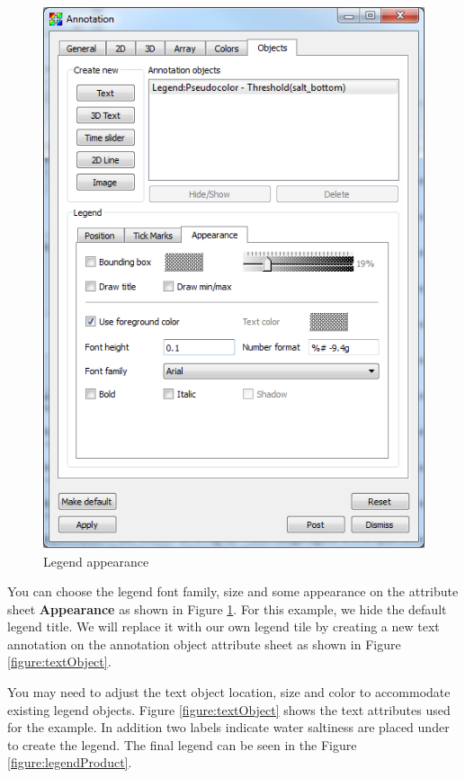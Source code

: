 \documentclass[12pt]{report}
\begin{document}
				\begin{figure}
        \begin{center}
        \includegraphics{legendAttrAppear}
        \caption{Legend appearance}
        \label{figure:legendAttrAppear}
        \end{center}
        \end{figure} 
				  
You can choose the legend font family, size and some appearance on the attribute sheet {\bf Appearance} as shown in
Figure \ref{figure:legendAttrAppear}. For this example, we hide the default legend title. We will replace it with our
own legend tile by creating a new text annotation on the annotation 
object attribute sheet as shown in Figure \ref{figure:textObject}. 

You may need to adjust the text object location,
size and color to accommodate existing legend objects. 
Figure \ref{figure:textObject} shows the text attributes used  
for the example. In addition two labels indicate water saltiness are placed under
to create the legend. The final legend can be seen in the Figure \ref{figure:legendProduct}.
				
\end{document}
